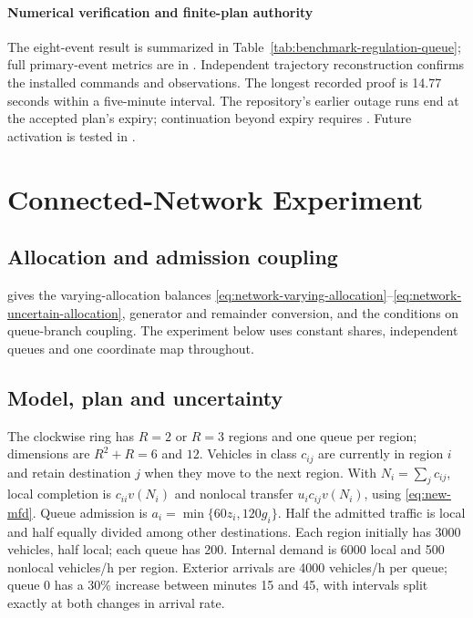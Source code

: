 \paragraph{Numerical verification and finite-plan authority}
\label{sec:new-numerical-audit}
The eight-event result is summarized in
Table~\ref{tab:benchmark-regulation-queue}; full primary-event metrics are
in . Independent trajectory reconstruction
confirms the installed commands and observations. The longest recorded
proof is 14.77 seconds within a five-minute interval. The repository's
earlier outage runs end at the accepted plan's expiry; continuation beyond
expiry requires . Future activation is tested
in .

\FloatBarrier
\section{Connected-Network Experiment}
\label{app:network-transfer}

\subsection{Allocation and admission coupling}
 gives the varying-allocation balances
\eqref{eq:network-varying-allocation}--\eqref{eq:network-uncertain-allocation},
generator and remainder conversion, and the conditions on queue-branch
coupling. The experiment below uses constant shares, independent queues
and one coordinate map throughout.

\subsection{Model, plan and uncertainty}
The clockwise ring has $R=2$ or $R=3$ regions and one queue per region;
dimensions are $R^2+R=6$ and $12$. Vehicles in class $c_{ij}$ are currently in region $i$ and retain
destination $j$ when they move to the next region. With $N_i=\sum_jc_{ij}$, local completion is
$c_{ii}v(N_i)$ and nonlocal transfer $u_i c_{ij}v(N_i)$, using
\eqref{eq:new-mfd}. Queue admission is $a_i=\min\{60z_i,120g_i\}$.
Half the admitted traffic is local and half equally divided among other
destinations. Each region initially has 3000 vehicles, half local; each
queue has 200. Internal demand is 6000 local and 500 nonlocal vehicles/h
per region. Exterior arrivals are 4000 vehicles/h per queue; queue 0 has
a 30\% increase between minutes 15 and 45, with intervals split exactly at both changes in arrival rate.

